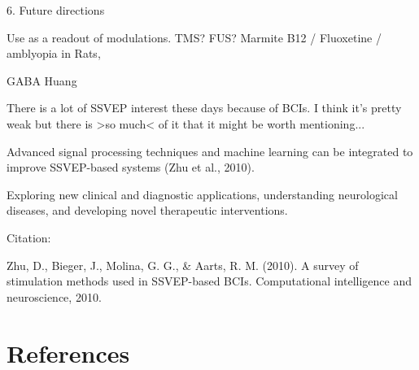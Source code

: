 \documentclass[
  letterpaper,
  DIV=11,
  numbers=noendperiod]{scrartcl}
\begin{document}
\label{anchor-10}{}6. Future directions

Use as a readout of modulations. TMS? FUS? Marmite B12 / Fluoxetine /
amblyopia in Rats,

GABA Huang

There is a lot of SSVEP interest these days because of BCIs. I think
it's pretty weak but there is \textgreater so much\textless{} of it that
it might be worth mentioning...

Advanced signal processing techniques and machine learning can be
integrated to improve SSVEP-based systems (Zhu et al., 2010).

Exploring new clinical and diagnostic applications, understanding
neurological diseases, and developing novel therapeutic interventions.

Citation:

Zhu, D., Bieger, J., Molina, G. G., \& Aarts, R. M. (2010). A survey of
stimulation methods used in SSVEP-based BCIs. Computational intelligence
and neuroscience, 2010.

\section*{References}\label{references}
\end{document}
